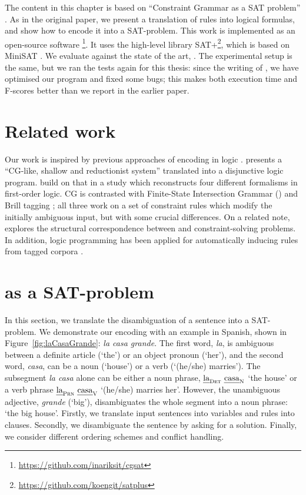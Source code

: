The content in this chapter is based on ``Constraint Grammar as a SAT
problem'' \cite{listenmaa_claessen2015}.  As in the original paper, we
present a translation of \onlycg{} rules into logical formulas, and
show how to encode it into a SAT-problem.  This work is implemented as
an open-source software
\satcg{}\footnote{\url{https://github.com/inariksit/cgsat}}. It uses
the high-level library
SAT+\footnote{\url{https://github.com/koengit/satplus}}, which is
based on MiniSAT \cite{een04sat}.  We evaluate \satcg{} against the
state of the art, .  The experimental setup is the same, but
we ran the tests again for this thesis: since the writing of
\citet{listenmaa_claessen2015}, we have optimised our program and
fixed some bugs; this makes both execution time and F-scores better
than we report in the earlier paper.


\section{Related work}\label{encoding-in-logic}

Our work is inspired by previous approaches of encoding \onlycg{} in logic \cite{lager98, lager_nivre01}.
\citet{lager98} presents a ``CG-like, shallow and reductionist system'' translated into a disjunctive logic program.
\citet{lager_nivre01} build on that in a study which reconstructs
four different formalisms in first-order logic. 
CG is contrasted with Finite-State Intersection Grammar (\fsig) \cite{koskenniemi90} 
and Brill tagging \cite{brill1995}; all three work on a set of constraint rules 
which modify the initially ambiguous input, but with some crucial differences.
On a related note, \citet{yli-jyra2001} explores the structural correspondence 
between \fsig{} and constraint-solving problems.
In addition, logic programming has been applied for automatically inducing \onlycg{} rules from tagged corpora \cite{lindberg_eineborg98ilp,asfrent14,lager01transformation}.


\section{\onlycg{} as a SAT-problem}
\label{sec:CGSAT}

In this section, we translate the disambiguation of a sentence into a SAT-problem.
We demonstrate our encoding with an example in Spanish, shown in Figure~\ref{fig:laCasaGrande}: {\em la casa grande}. %
The first word, {\em la}, is ambiguous between a definite article (`the') or an object pronoun (`her'), and the second word, {\em casa}, can be a noun (`house') or a verb (`(he/she) marries').
The subsegment {\em la casa} alone can be either a noun phrase, $\text{\em la}_{\text{\sc Det}} \ \text{\em casa}_{\text{\sc N}}$ 
`the house'  or a verb phrase $\text{\em la}_{\text{\sc Prn}} \ \text{\em casa}_{\text{\sc V}}$   `(he/she) marries her'. 
However, the unambiguous adjective, {\em grande} (`big'), disambiguates the whole segment into a noun phrase: `the big house'.
%
Firstly, we translate input sentences into variables and rules into clauses.
Secondly, we disambiguate the sentence by asking for a solution. 
Finally, we consider different ordering schemes and conflict handling.


